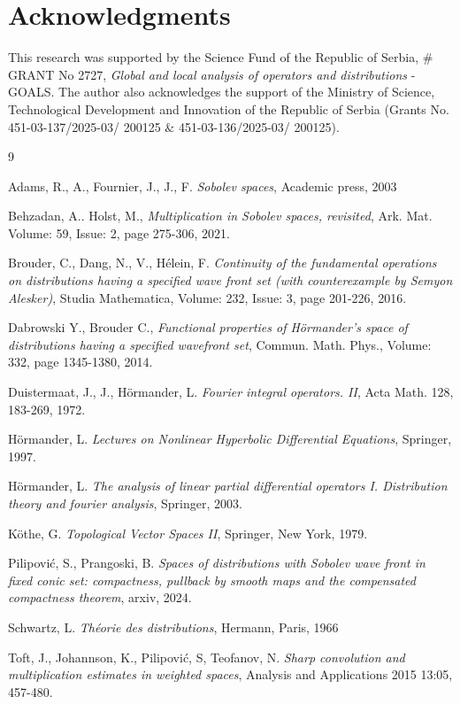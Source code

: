 \documentclass{amsart}
\theoremstyle{definition}
\begin{document}
\section*{Acknowledgments}
This research was  supported by the Science Fund of the Republic of Serbia, $\#$GRANT No 2727, \emph{Global and local analysis of operators and distributions} - GOALS. The author also acknowledges the support of the Ministry of Science, Technological Development and Innovation of the Republic of Serbia (Grants No. 451-03-137/2025-03/ 200125 $\&$ 451-03-136/2025-03/ 200125).


\begin{thebibliography}{9}

 Adams, R., A., Fournier, J., J., F. \textit{Sobolev spaces}, Academic press, 2003

 Behzadan, A.. Holst, M., \textit{Multiplication in Sobolev spaces, revisited}, Ark. Mat. Volume: 59, Issue: 2, page 275-306, 2021.

 Brouder, C., Dang, N., V., Hélein, F. \textit{Continuity of the fundamental operations on distributions having a specified wave front set (with counterexample by Semyon Alesker)}, Studia Mathematica, Volume: 232, Issue: 3, page 201-226, 2016.

 Dabrowski Y., Brouder C., \textit{Functional properties of H\"ormander’s space of distributions having a specified wavefront set}, Commun. Math. Phys., Volume: 332, page 1345-1380, 2014.

  Duistermaat, J., J., H\"ormander, L. \textit{Fourier integral operators. II}, Acta Math. 128, 183-269, 1972.

  H\"ormander, L. \textit{Lectures on Nonlinear Hyperbolic Differential Equations}, Springer, 1997.

  H\"ormander, L. \textit{The analysis of linear partial differential operators I. Distribution theory and fourier analysis}, Springer, 2003.

  K\"othe, G. \textit{Topological Vector Spaces II}, Springer, New York, 1979.

  Pilipovi\'c, S., Prangoski, B. \textit{Spaces of distributions with Sobolev wave front in fixed conic set: compactness, pullback by smooth maps and the compensated compactness theorem}, arxiv, 2024.

  Schwartz, L. \textit{Th\'eorie des distributions}, Hermann, Paris, 1966

  Toft, J., Johannson, K., Pilipovi\'c, S, Teofanov, N. \textit{Sharp convolution and multiplication estimates in weighted spaces}, Analysis and Applications 2015 13:05, 457-480.

\end{thebibliography}
\end{document}
